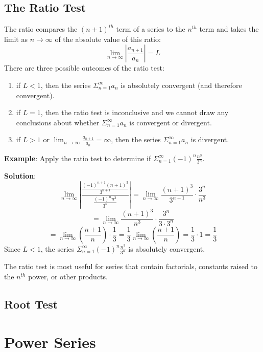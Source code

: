 \subsection{The Ratio Test}
The ratio compares the $(n + 1)^{th}$ term of a series to the $n^{th}$ term 
and takes the limit as $n \to \infty$ of the absolute value of this ratio:
$$\lim_{n \to \infty} \left| \frac{a_{n + 1}}{a_n} \right| = L$$
There are three possible outcomes of the ratio test:
\begin{enumerate}
\item if $L < 1$, then the series $\Sigma_{n=1}^\infty a_n$ is absolutely 
convergent (and therefore convergent).
\item if $L = 1$, then the ratio test is inconclusive and we cannot draw any 
conclusions about whether $\Sigma_{n=1}^\infty a_n$ is convergent or divergent.
\item if $L > 1$ or $\lim_{n \to \infty} \frac{a_{n + 1}}{a_n} = \infty$, then 
the series $\Sigma_{n=1}^\infty a_n$ is divergent.
\end{enumerate}

\textbf{Example}: Apply the ratio test to determine if $\Sigma_{n=1}^\infty 
(-1)^n \frac{n^3}{3^n}$.

\textbf{Solution}: 
$$\lim_{n \to \infty} \left| \frac{\frac{(-1)^{n + 1}(n + 1)^3}{3^{n + 1}}}{
\frac{(-1)^n n^3}{3^n}} \right| = \lim_{n \to \infty} \frac{(n + 1)^3}{3^{n + 
1}} \cdot \frac{3^n}{n^3}$$
$$= \lim_{n \to \infty} \frac{(n + 1)^3}{n^3} \cdot \frac{3^n}{3 \cdot 3^n}$$
$$= \lim_{n \to \infty} \left( \frac{n + 1}{n} \right) \cdot \frac{1}{3} = 
\frac{1}{3} \lim_{n \to \infty} \left( \frac{n + 1}{n} \right) = \frac{1}{3} 
\cdot 1 = \frac{1}{3} $$
Since $L < 1$, the series $\Sigma_{n=1}^\infty (-1)^n \frac{n^3}{3^n}$ is absolutely convergent. 

The ratio test is most useful for series that contain factorials, constants raised to the $n^{th}$ power, or other products. 

\subsection{Root Test}













\section{Power Series}
